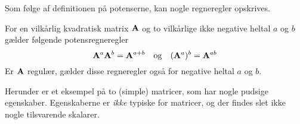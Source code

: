 Som følge af definitionen på potenserne, kan nogle regneregler opskrives.

\begin{theorem} \label{tn4.defpotensregne}
For en vilkårlig kvadratisk matrix $ \mathbf{A} $ og to vilkårlige ikke negative heltal $ a $ og $ b $ gælder følgende potensregneregler
\begin{equation}
\mathbf{A}^a \mathbf{A}^b = \mathbf{A}^{a+b} \quad \mathrm{og} \quad (\mathbf{A}^a)^b = \mathbf{A}^{ab}
\end{equation}
Er $ \mathbf{A} $ regulær, gælder disse regneregler også for negative heltal $ a $ og $ b $.
\end{theorem}

Herunder er et eksempel på to (simple) matricer, som har nogle pudsige egenskaber. Egenskaberne er \textit{ikke} typiske for matricer, og der findes slet ikke nogle tilsvarende skalarer. 


